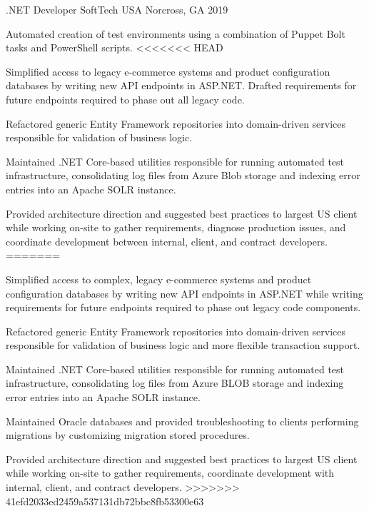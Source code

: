 \begin{cventries}
  \cventry
    {.NET Developer} %
    {SoftTech USA} %
    {Norcross, GA} %
    {2019} %
    {
      \begin{cvitems} %
        \item {Automated creation of test environments using a combination of Puppet Bolt tasks and PowerShell scripts.}
<<<<<<< HEAD
        \item {Simplified access to legacy e-commerce systems and product configuration databases by writing new API endpoints in ASP.NET. Drafted requirements for future endpoints required to phase out all legacy code.}
        \item {Refactored generic Entity Framework repositories into domain-driven services responsible for validation of business logic.}
        \item {Maintained .NET Core-based utilities responsible for running automated test infrastructure, consolidating log files from Azure Blob storage and indexing error entries into an Apache SOLR instance.}
        \item {Provided architecture direction and suggested best practices to largest US client while working on-site to gather requirements, diagnose production issues, and coordinate development between internal, client, and contract developers.}
=======
        \item {Simplified access to complex, legacy e-commerce systems and product configuration databases by writing new API endpoints in ASP.NET while writing requirements for future endpoints required to phase out legacy code components.}
        \item {Refactored generic Entity Framework repositories into domain-driven services responsible for validation of business logic and more flexible transaction support.}
        \item {Maintained .NET Core-based utilities responsible for running automated test infrastructure, consolidating log files from Azure BLOB storage and indexing error entries into an Apache SOLR instance.}
        \item {Maintained Oracle databases and provided troubleshooting to clients performing migrations by customizing migration stored procedures.}
        \item {Provided architecture direction and suggested best practices to largest US client while working on-site to gather requirements, coordinate development with internal, client, and contract developers.}
>>>>>>> 41efd2033ed2459a537131db72bbc8fb53300e63
      \end{cvitems}
    }


\end{cventries}
